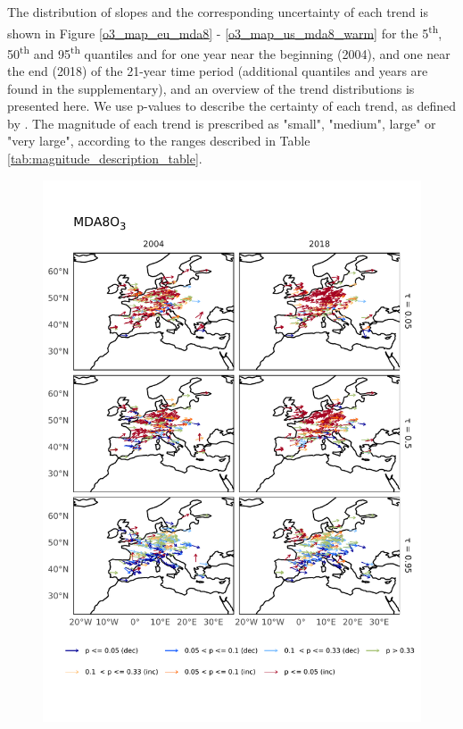 \documentclass[journal abbreviation, manuscript]{copernicus}
\begin{document}
The distribution of slopes and the corresponding uncertainty of each trend is shown in Figure \ref{o3_map_eu_mda8} - \ref{o3_map_us_mda8_warm} for the 5\textsuperscript{th}, 50\textsuperscript{th} and 95\textsuperscript{th} quantiles and for one year near the beginning (2004), and one near the end (2018) of the 21-year time period (additional quantiles and years are found in the supplementary), and an overview of the trend distributions is presented here. We use p-values to describe the certainty of each trend, as defined by \cite{chang2023guidancenotebeststatistical}. The magnitude of each trend is prescribed as "small", "medium", large" or "very large", according to the ranges described in Table \ref{tab:magnitude_description_table}.

\begin{figure}[h!]
\centering
\includegraphics[height=\textheight]{figures/paper_figures/o3_map/o3_map_piecewise_stats_freeTau_mda8_anom_all_eu_o3.pdf}
\caption{}
\label{fig:o3_map_eu_mda8}
\end{figure}
\end{document}
